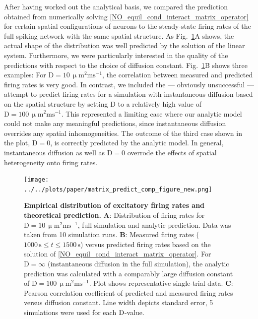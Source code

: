 \documentclass[10pt,letterpaper]{article}
\begin{document}
After having worked out the analytical basis, we compared the prediction obtained from numerically solving \eqref{NO_equil_cond_interact_matrix_operator} for certain spatial configurations of neurons to the steady-state firing rates of the full spiking network with the same spatial structure. As Fig.~\ref{Matrix_Predict_Comp}A shows, the actual shape of the distribution was well predicted by the solution of the linear system. Furthermore, we were particularly interested in the quality of the predictions with respect to the choice of diffusion constant. Fig.~\ref{Matrix_Predict_Comp}B shows three examples: For $\mathrm{D=10\, \upmu m^2 ms^{-1}}$, the correlation between measured and predicted firing rates is very good. In contrast, we included the --- obviously unsuccessful --- attempt to predict firing rates for a simulation with instantaneous diffusion based on the spatial structure by setting D to a relatively high value of $\mathrm{D=100\, \upmu m^2 ms^{-1}}$. This represented a limiting case where our analytic model could not make any meaningful predictions, since instantaneous diffusion overrides any spatial inhomogeneities. The outcome of the third case shown in the plot, $\mathrm{D=0}$, is correctly predicted by the analytic model. In general, instantaneous diffusion as well as $\mathrm{D=0}$ overrode the effects of spatial heterogeneity onto firing rates. 

\begin{figure}
\texttt{[image: ../../plots/paper/matrix\_predict\_comp\_figure\_new.png]}
\caption{{\bf Empirical distribution of excitatory firing rates and theoretical prediction.} \textbf{A}: Distribution of firing rates for $\mathrm{D=10\, \upmu m^2 ms^{-1}}$, full simulation and analytic prediction. Data was taken from 10 simulation runs. \textbf{B}: Measured firing rates ($\mathrm{ 1000\,s} \leq t \leq \mathrm{1500\, s}$) versus predicted firing rates based on the solution of  \eqref{NO_equil_cond_interact_matrix_operator}. For $\mathrm{D=\infty}$ (instantaneous diffusion in the full simulation), the analytic prediction was calculated with a comparably large diffusion constant of $\mathrm{D=100\, \upmu m^2 ms^{-1}}$. Plot shows representative single-trial data. \textbf{C}: Pearson correlation coefficient of predicted and measured firing rates versus diffusion constant. Line width depicts standard error, 5 simulations were used for each $\rm D$-value.}
\label{Matrix_Predict_Comp}
\end{figure}
\end{document}
